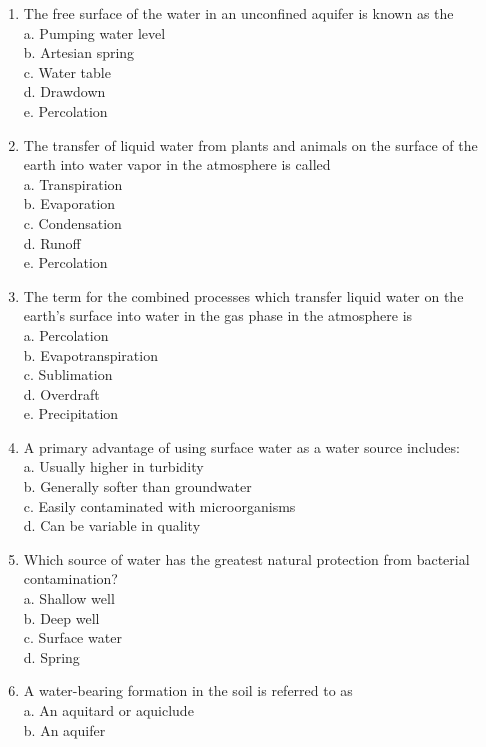 \begin{enumerate}
\item The free surface of the water in an unconfined aquifer is known as the\\
a. Pumping water level\\
b. Artesian spring\\
c. Water table\\
d. Drawdown\\
e. Percolation\\
\item The transfer of liquid water from plants and animals on the surface of the earth into water vapor in the atmosphere is called\\
a. Transpiration\\
b. Evaporation\\
c. Condensation\\
d. Runoff\\
e. Percolation\\
\item The term for the combined processes which transfer liquid water on the earth's surface into water in the gas phase in the atmosphere is\\
a. Percolation\\
b. Evapotranspiration\\
c. Sublimation\\
d. Overdraft\\
e. Precipitation\\
\item A primary advantage of using surface water as a water source includes:\\
a. Usually higher in turbidity\\
b. Generally softer than groundwater\\
c. Easily contaminated with microorganisms\\
d. Can be variable in quality\\
\item Which source of water has the greatest natural protection from bacterial contamination?\\
a. Shallow well\\
b. Deep well\\
c. Surface water\\
d. Spring\\
\item A water-bearing formation in the soil is referred to as\\
a. An aquitard or aquiclude\\
b. An aquifer\\

\end{enumerate}

